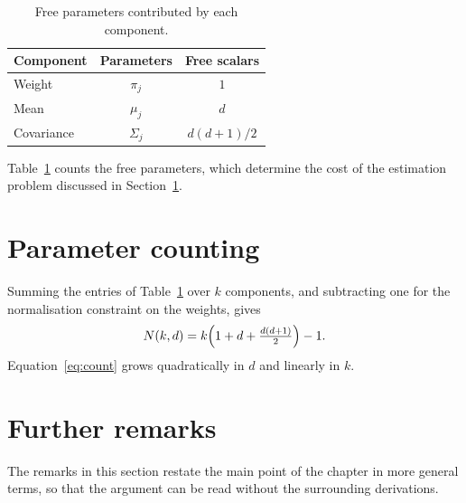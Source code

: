 \lipsum[15-16]

\begin{table}[ht]
  \centering
  \begin{tabular}{lcc}
    \toprule
    Component & Parameters & Free scalars \\
    \midrule
    Weight & $\pi_j$ & $1$ \\
    Mean & $\mu_j$ & $d$ \\
    Covariance & $\Sigma_j$ & $d(d+1)/2$ \\
    \bottomrule
  \end{tabular}
  \caption{Free parameters contributed by each component.}\label{tab:params}
\end{table}

Table~\ref{tab:params} counts the free parameters, which determine the cost
of the estimation problem discussed in Section~\ref{sec:counting}.

\section{Parameter counting}\label{sec:counting}

Summing the entries of Table~\ref{tab:params} over $k$ components, and
subtracting one for the normalisation constraint on the weights, gives
\begin{equation}\label{eq:count}
  N(k,d) = k\Bigl(1 + d + \tfrac{d(d+1)}{2}\Bigr) - 1 .
\end{equation}
Equation~\eqref{eq:count} grows quadratically in $d$ and linearly in $k$.

\lipsum[17-18]

\section{Further remarks}\label{sec:further-model}

The remarks in this section restate the main point of the chapter in more
general terms, so that the argument can be read without the surrounding
derivations.

\lipsum[75-86]
